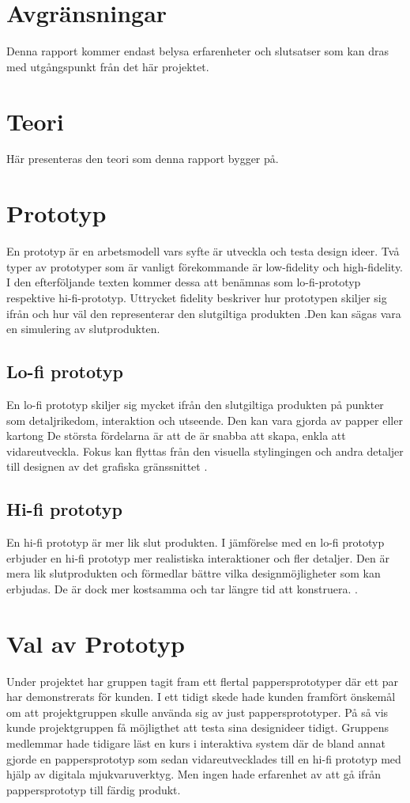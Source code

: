 \section{Avgränsningar}
Denna rapport kommer endast belysa erfarenheter och slutsatser som kan dras med utgångspunkt från det här projektet.

\section{Teori}
Här presenteras den teori som denna rapport bygger på.

\section{Prototyp}
En prototyp är en arbetsmodell vars syfte är utveckla och testa design ideer. Två typer av prototyper som är vanligt 
förekommande är low-fidelity och high-fidelity. I den efterföljande texten kommer dessa att benämnas som lo-fi-prototyp 
respektive hi-fi-prototyp. Uttrycket fidelity beskriver hur prototypen skiljer sig ifrån och hur väl den representerar den 
slutgiltiga produkten \cite{prototypeChoise}.Den kan sägas vara en simulering av slutprodukten.     

\subsection{Lo-fi prototyp}
En lo-fi prototyp skiljer sig mycket ifrån den slutgiltiga produkten på punkter som detaljrikedom, interaktion och 
utseende. Den kan vara gjorda av papper eller kartong De största fördelarna är att de är snabba att skapa, enkla att 
vidareutveckla. Fokus kan flyttas från den visuella stylingingen och andra detaljer till designen av det grafiska 
gränssnittet \cite{prototypeChoise}.

\subsection{Hi-fi prototyp}
En hi-fi prototyp är mer lik slut produkten.  I jämförelse med en lo-fi prototyp erbjuder en hi-fi prototyp mer 
realistiska interaktioner och fler detaljer. Den är mera lik slutprodukten och förmedlar bättre vilka designmöjligheter 
som kan erbjudas. De är dock mer kostsamma och tar längre tid att konstruera.  \cite{prototypeChoise}.

\section{Val av Prototyp} 
Under projektet har gruppen tagit fram ett flertal pappersprototyper där ett par har demonstrerats för kunden. I ett 
tidigt skede hade kunden framfört önskemål om att projektgruppen skulle använda sig av just pappersprototyper. På så vis 
kunde projektgruppen få möjligthet att testa sina designideer tidigt. Gruppens medlemmar hade tidigare läst en kurs i 
interaktiva system där de bland annat gjorde en pappersprototyp som sedan vidareutvecklades till en hi-fi prototyp med 
hjälp av digitala mjukvaruverktyg. Men ingen hade erfarenhet av att gå ifrån pappersprototyp till färdig produkt. 

